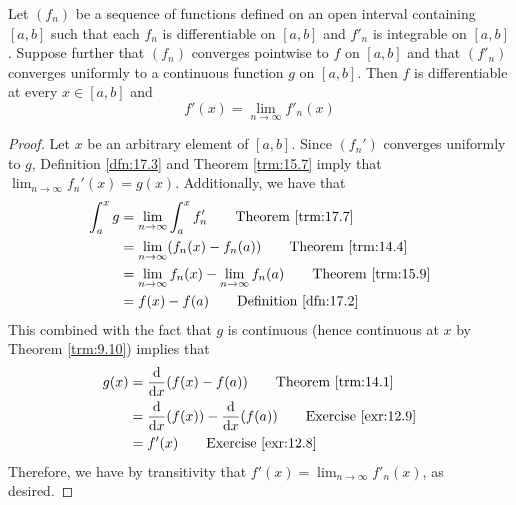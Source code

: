 \documentclass[../main.tex]{subfiles}
\begin{document}
\begin{theorem}\label{trm:17.8}
    Let $(f_n)$ be a sequence of functions defined on an open interval containing $[a,b]$ such that each $f_n$ is differentiable on $[a,b]$ and $f'_n$ is integrable on $[a,b]$. Suppose further that $(f_n)$ converges pointwise to $f$ on $[a,b]$ and that $(f'_n)$ converges uniformly to a continuous function $g$ on $[a,b]$. Then $f$ is differentiable at every $x\in[a,b]$ and
    \begin{equation*}
        f'(x) = \lim_{n\to\infty}f'_n(x)
    \end{equation*}
    \begin{proof}
        Let $x$ be an arbitrary element of $[a,b]$. Since $(f_n')$ converges uniformly to $g$, Definition \ref{dfn:17.3} and Theorem \ref{trm:15.7} imply that $\lim_{n\to\infty}f_n'(x)=g(x)$. Additionally, we have that
        \begin{align*}
            \int_a^xg &= \lim_{n\to\infty}\int_a^xf_n'\tag*{Theorem \ref{trm:17.7}}\\
            &= \lim_{n\to\infty}(f_n(x)-f_n(a))\tag*{Theorem \ref{trm:14.4}}\\
            &= \lim_{n\to\infty}f_n(x)-\lim_{n\to\infty}f_n(a)\tag*{Theorem \ref{trm:15.9}}\\
            &= f(x)-f(a)\tag*{Definition \ref{dfn:17.2}}
        \end{align*}
        This combined with the fact that $g$ is continuous (hence continuous at $x$ by Theorem \ref{trm:9.10}) implies that
        \begin{align*}
            g(x) &= \dv{x}(f(x)-f(a))\tag*{Theorem \ref{trm:14.1}}\\
            &= \dv{x}(f(x))-\dv{x}(f(a))\tag*{Exercise \ref{exr:12.9}}\\
            &= f'(x)\tag*{Exercise \ref{exr:12.8}}
        \end{align*}
        Therefore, we have by transitivity that $f'(x)=\lim_{n\to\infty}f'_n(x)$, as desired.
    \end{proof}
\end{theorem}
\end{document}
